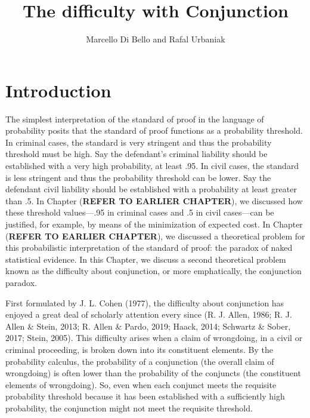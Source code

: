\documentclass[
  10pt,
  dvipsnames,enabledeprecatedfontcommands]{scrartcl}
\title{The difficulty with Conjunction}
\author{Marcello Di Bello and Rafal Urbaniak}
\date{}
\begin{document}
\maketitle

\tableofcontents

\hypertarget{introduction}{%
\section{Introduction}\label{introduction}}

The simplest interpretation of the standard of proof in the language of
probability posits that the standard of proof functions as a probability
threshold. In criminal cases, the standard is very stringent and thus
the probability threshold must be high. Say the defendant's criminal
liability should be established with a very high probability, at least
.95. In civil cases, the standard is less stringent and thus the
probability threshold can be lower. Say the defendant civil liability
should be established with a probability at least greater than .5. In
Chapter (\textbf{REFER TO EARLIER CHAPTER}), we discussed how these
threshold values---.95 in criminal cases and .5 in civil cases---can be
justified, for example, by means of the minimization of expected cost.
In Chapter (\textbf{REFER TO EARLIER CHAPTER}), we discussed a
theoretical problem for this probabilistic interpretation of the
standard of proof: the paradox of naked statistical evidence. In this
Chapter, we discuss a second theoretical problem known as the difficulty
about conjunction, or more emphatically, the conjunction paradox.

First formulated by J. L. Cohen (1977), the difficulty about conjunction
has enjoyed a great deal of scholarly attention every since (R. J.
Allen, 1986; R. J. Allen \& Stein, 2013; R. Allen \& Pardo, 2019; Haack,
2014; Schwartz \& Sober, 2017; Stein, 2005). This difficulty arises when
a claim of wrongdoing, in a civil or criminal proceeding, is broken down
into its constituent elements. By the probability calculus, the
probability of a conjunction (the overall claim of wrongdoing) is often
lower than the probability of the conjuncts (the constituent elements of
wrongdoing). So, even when each conjunct meets the requisite probability
threshold because it has been established with a sufficiently high
probability, the conjunction might not meet the requisite threshold.
\end{document}
